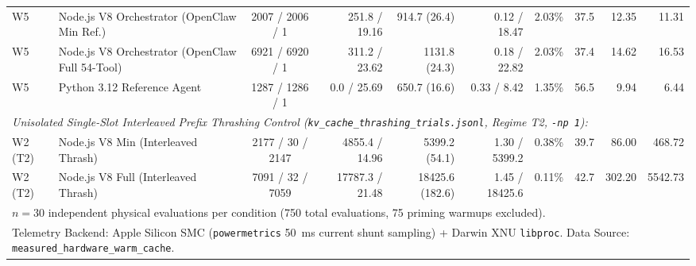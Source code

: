 \begin{table}[t]
\begin{tabular}{l l c r r r r r r r}
W5 & Node.js V8 Orchestrator (OpenClaw Min Ref.) & 2007 / 2006 / 1 & 251.8 / 19.16 & 914.7 (26.4) & 0.12 / 18.47 & 2.03\% & 37.5 & 12.35 & 11.31 \\
W5 & Node.js V8 Orchestrator (OpenClaw Full 54-Tool) & 6921 / 6920 / 1 & 311.2 / 23.62 & 1131.8 (24.3) & 0.18 / 22.82 & 2.03\% & 37.4 & 14.62 & 16.53 \\
W5 & Python 3.12 Reference Agent & 1287 / 1286 / 1 & 0.0 / 25.69 & 650.7 (16.6) & 0.33 / 8.42 & 1.35\% & 56.5 & 9.94 & 6.44 \\
\hline
\multicolumn{10}{l}{\textit{Unisolated Single-Slot Interleaved Prefix Thrashing Control (\texttt{kv\_cache\_thrashing\_trials.jsonl}, Regime T2, \texttt{-np 1}):}} \\
W2 (T2) & Node.js V8 Min (Interleaved Thrash) & 2177 / 30 / 2147 & 4855.4 / 14.96 & 5399.2 (54.1) & 1.30 / 5399.2 & 0.38\% & 39.7 & 86.00 & 468.72 \\
W2 (T2) & Node.js V8 Full (Interleaved Thrash) & 7091 / 32 / 7059 & 17787.3 / 21.48 & 18425.6 (182.6) & 1.45 / 18425.6 & 0.11\% & 42.7 & 302.20 & 5542.73 \\
\hline
\multicolumn{10}{l}{\footnotesize $n = 30$ independent physical evaluations per condition (750 total evaluations, 75 priming warmups excluded).} \\
\multicolumn{10}{l}{\footnotesize Telemetry Backend: Apple Silicon SMC (\texttt{powermetrics} 50~ms current shunt sampling) + Darwin XNU \texttt{libproc}. Data Source: \texttt{measured\_hardware\_warm\_cache}.} \\
\hline
\end{tabular}
\end{table}
